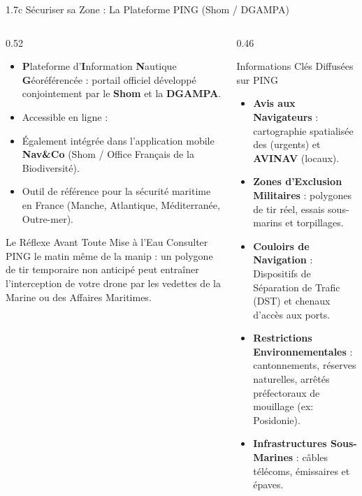 \begin{frame}{1.7c Sécuriser sa Zone : La Plateforme PING (Shom / DGAMPA)}
  \begin{columns}[T]
    \begin{column}{0.52\textwidth}
      \begin{block}{}
        \scriptsize
        \begin{itemize}
          \item \textbf{P}lateforme d'\textbf{I}nformation \textbf{N}autique \textbf{G}éoréférencée : portail officiel développé conjointement par le \textbf{Shom} et la \textbf{DGAMPA}.
          \item Accessible en ligne : \href{https://portail.ping-info-nautique.fr/}{\underline{}}
          \item Également intégrée dans l'application mobile \textbf{Nav\&Co} (Shom / Office Français de la Biodiversité).
          \item Outil de référence pour la sécurité maritime en France (Manche, Atlantique, Méditerranée, Outre-mer).
        \end{itemize}
      \end{block}

      \begin{alertblock}{Le Réflexe Avant Toute Mise à l'Eau}
        \scriptsize
        Consulter PING le matin même de la manip : un polygone de tir temporaire non anticipé peut entraîner l'interception de votre drone par les vedettes de la Marine ou des Affaires Maritimes.
      \end{alertblock}
    \end{column}

    \begin{column}{0.46\textwidth}
      \begin{exampleblock}{Informations Clés Diffusées sur PING}
        \scriptsize
        \begin{itemize}
          \item \textbf{Avis aux Navigateurs} : cartographie spatialisée des  (urgents) et \textbf{AVINAV} (locaux).
          \item \textbf{Zones d'Exclusion Militaires} : polygones de tir réel, essais sous-marins et torpillages.
          \item \textbf{Couloirs de Navigation} : Dispositifs de Séparation de Trafic (DST) et chenaux d'accès aux ports.
          \item \textbf{Restrictions Environnementales} : cantonnements, réserves naturelles, arrêtés préfectoraux de mouillage (ex: Posidonie).
          \item \textbf{Infrastructures Sous-Marines} : câbles télécoms, émissaires et épaves.
        \end{itemize}
      \end{exampleblock}
    \end{column}
  \end{columns}
\end{frame}

